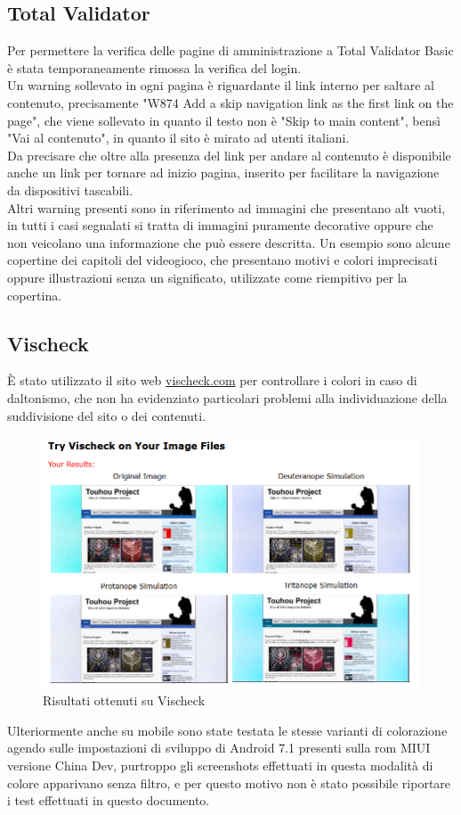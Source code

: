 \documentclass[openany, a4paper, 12pt]{report}
\begin{document}
			\subsection{Total Validator}
			Per permettere la verifica delle pagine di amministrazione a Total Validator Basic è stata temporaneamente rimossa la verifica del login.\\
			Un warning sollevato in ogni pagina è riguardante il link interno per saltare al contenuto, precisamente "W874 Add a skip navigation link as the first link on the page", che viene sollevato in quanto il testo non è "Skip to main content", bensì "Vai al contenuto", in quanto il sito è mirato ad utenti italiani.\\
			Da precisare che oltre alla presenza del link per andare al contenuto è disponibile anche un link per tornare ad inizio pagina, inserito per facilitare la navigazione da dispositivi tascabili.\\
			Altri warning presenti sono in riferimento ad immagini che presentano alt vuoti, in tutti i casi segnalati si tratta di immagini puramente decorative oppure che non veicolano una informazione che può essere descritta. Un esempio sono alcune copertine dei capitoli del videogioco, che presentano motivi e colori imprecisati oppure illustrazioni senza un  significato, utilizzate come riempitivo per la copertina.

			\subsection{Vischeck}
			\`{E} stato utilizzato il sito web \url{vischeck.com} per controllare i colori in caso di daltonismo, che non ha evidenziato particolari problemi alla individuazione della suddivisione del sito o dei contenuti.
			
			\begin{figure}[H]
				\centering
				\includegraphics[width=0.8\linewidth]{images/daltonismo}
				\caption{Risultati ottenuti su Vischeck}
			\end{figure}
			Ulteriormente anche su mobile sono state testata le stesse varianti di colorazione agendo sulle impostazioni di sviluppo di Android 7.1 presenti sulla rom MIUI versione China Dev, purtroppo gli screenshots effettuati in questa modalità di colore apparivano senza filtro, e per questo motivo non è stato possibile riportare i test effettuati in questo documento.
			
\end{document}
